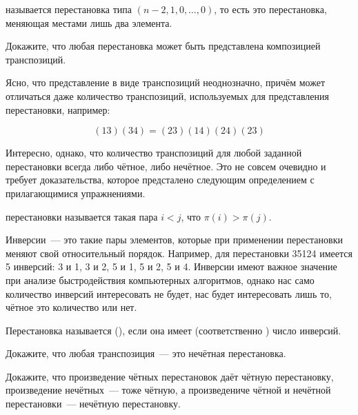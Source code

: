 \begin{definition}
 называется перестановка типа $(n-2, 1, 0, \ldots, 0)$, то есть это перестановка, меняющая местами лишь два элемента.
\end{definition}

\begin{exercise}
Докажите, что любая перестановка может быть представлена композицией транспозиций.
\end{exercise}

Ясно, что представление в виде транспозиций неоднозначно, причём может отличаться даже количество транспозиций, используемых для представления перестановки, например:

$$(13)(34) = (23)(14)(24)(23)$$

Интересно, однако, что количество транспозиций для любой заданной перестановки всегда либо чётное, либо нечётное. Это не совсем очевидно и требует доказательства, которое предсталено следующим определением с прилагающимися упражнениями.

\begin{definition}
 перестановки называется такая пара $i<j$, что $\pi(i) > \pi(j)$.
\end{definition}

Инверсии~--- это такие пары элементов, которые при применении перестановки меняют свой относительный порядок. Например, для перестановки 35124 имеется 5 инверсий: 3 и 1, 3 и 2, 5 и 1, 5 и 2, 5 и 4. Инверсии имеют важное значение при анализе быстродействия компьютерных алгоритмов, однако нас само количество инверсий интересовать не будет, нас будет интересовать лишь то, чётное это количество или нет.

\begin{definition}
Перестановка называется  (), если она имеет  (соответственно ) число инверсий.
\end{definition}

\begin{exercise}
Докажите, что любая транспозиция~--- это нечётная перестановка.
\end{exercise}

\begin{exercise}
Докажите, что произведение чётных перестановок даёт чётную перестановку, произведение нечётных~--- тоже чётную, а произведениче чётной и нечётной перестановки~--- нечётную перестановку.
\end{exercise}

